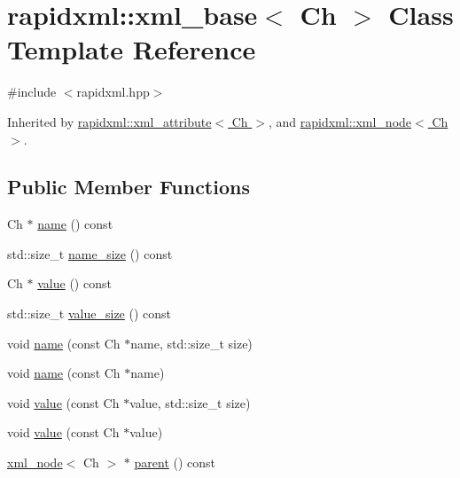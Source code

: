 \hypertarget{classrapidxml_1_1xml__base}{\section{rapidxml\-:\-:xml\-\_\-base$<$ Ch $>$ Class Template Reference}
\label{classrapidxml_1_1xml__base}
}


{\ttfamily \#include $<$rapidxml.\-hpp$>$}



Inherited by \hyperlink{classrapidxml_1_1xml__attribute}{rapidxml\-::xml\-\_\-attribute$<$ Ch $>$}, and \hyperlink{classrapidxml_1_1xml__node}{rapidxml\-::xml\-\_\-node$<$ Ch $>$}.

\subsection*{Public Member Functions}
\begin{DoxyCompactItemize}
\item 
Ch $\ast$ \hyperlink{classrapidxml_1_1xml__base_a9a09739310469995db078ebd0da3ed45}{name} () const 
\item 
std\-::size\-\_\-t \hyperlink{classrapidxml_1_1xml__base_a7e7f98b3d01e1eab8dc1ca69aad9af84}{name\-\_\-size} () const 
\item 
Ch $\ast$ \hyperlink{classrapidxml_1_1xml__base_adcdaccff61c665f039d9344e447b7445}{value} () const 
\item 
std\-::size\-\_\-t \hyperlink{classrapidxml_1_1xml__base_a9fcf201ed0915ac18dd43b0b5dcfaf32}{value\-\_\-size} () const 
\item 
void \hyperlink{classrapidxml_1_1xml__base_ae55060ae958c6e6465d6c8db852ec6ce}{name} (const Ch $\ast$name, std\-::size\-\_\-t size)
\item 
void \hyperlink{classrapidxml_1_1xml__base_a4611ddc82ac83a527c65606600eb2a0d}{name} (const Ch $\ast$name)
\item 
void \hyperlink{classrapidxml_1_1xml__base_a3b183c2db7022a6d30494dd2f0ac11e9}{value} (const Ch $\ast$value, std\-::size\-\_\-t size)
\item 
void \hyperlink{classrapidxml_1_1xml__base_a81e63ec4bfd2d7ef0a6c2ed49be6e623}{value} (const Ch $\ast$value)
\item 
\hyperlink{classrapidxml_1_1xml__node}{xml\-\_\-node}$<$ Ch $>$ $\ast$ \hyperlink{classrapidxml_1_1xml__base_a7f31ae930f93852830234db1ae59c4c4}{parent} () const 
\end{DoxyCompactItemize}
